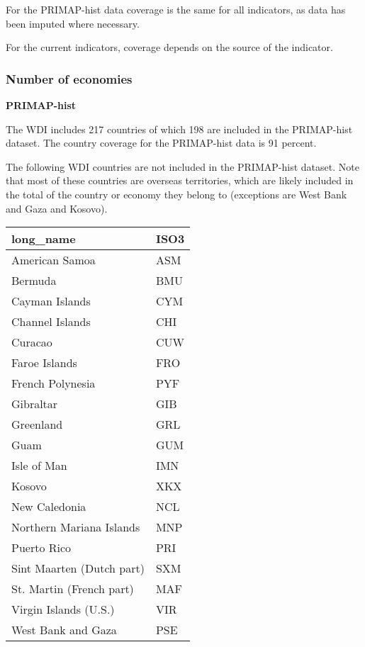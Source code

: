 \documentclass[
  letterpaper,
  DIV=11,
  numbers=noendperiod]{scrartcl}
\begin{document}
For the PRIMAP-hist data coverage is the same for all indicators, as
data has been imputed where necessary.

For the current indicators, coverage depends on the source of the
indicator.

\hypertarget{number-of-economies}{%
\subsubsection{Number of economies}\label{number-of-economies}}

\textbf{PRIMAP-hist}

The WDI includes 217 countries of which 198 are included in the
PRIMAP-hist dataset. The country coverage for the PRIMAP-hist data is 91
percent.

The following WDI countries are not included in the PRIMAP-hist dataset.
Note that most of these countries are overseas territories, which are
likely included in the total of the country or economy they belong to
(exceptions are West Bank and Gaza and Kosovo).

\begin{tabular}{l|l}
\hline
long\_name & ISO3\\
\hline
American Samoa & ASM\\
\hline
Bermuda & BMU\\
\hline
Cayman Islands & CYM\\
\hline
Channel Islands & CHI\\
\hline
Curacao & CUW\\
\hline
Faroe Islands & FRO\\
\hline
French Polynesia & PYF\\
\hline
Gibraltar & GIB\\
\hline
Greenland & GRL\\
\hline
Guam & GUM\\
\hline
Isle of Man & IMN\\
\hline
Kosovo & XKX\\
\hline
New Caledonia & NCL\\
\hline
Northern Mariana Islands & MNP\\
\hline
Puerto Rico & PRI\\
\hline
Sint Maarten (Dutch part) & SXM\\
\hline
St. Martin (French part) & MAF\\
\hline
Virgin Islands (U.S.) & VIR\\
\hline
West Bank and Gaza & PSE\\
\hline
\end{tabular}
\end{document}
